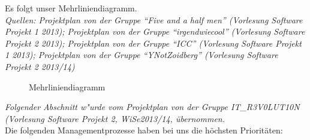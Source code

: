\documentclass[fontsize=12pt,paper=a4,twoside]{scrartcl}
\begin{document}
Es folgt unser Mehrliniendiagramm.\\
\textit{Quellen: Projektplan von der Gruppe ``Five and a half men'' (Vorlesung Software Projekt 1 2013); Projektplan von der Gruppe ``irgendwiecool'' (Vorlesung Software Projekt 2 2013); Projektplan von der Gruppe ``ICC'' (Vorlesung Software Projekt 1 2013);  Projektplan von der Gruppe ``YNotZoidberg'' (Vorlesung Software Projekt 2 2013/14)}
\newpage
\begin{figure}[h!]
\caption{Mehrliniendiagramm}
\label{Bild:image}
\end{figure}

\newpage
\textit{Folgender Abschnitt w"urde vom Projektplan von der Gruppe IT\_R3V0LUT10N (Vorlesung Software Projekt 2, WiSe2013/14, übernommen.}\\
Die folgenden Managementprozesse haben bei uns die höchsten Prioritäten:
 \\
\end{document}
